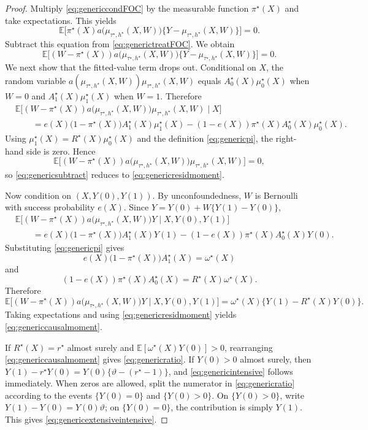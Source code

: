 \documentclass[11pt]{article}
\newcommand{\E}{\mathbb{E}}
\newcommand{\1}{\mathbf{1}}
\begin{document}
\begin{proof}
Multiply \eqref{eq:genericcondFOC} by the measurable function $\pi^\star(X)$ and take expectations. This yields
\[
\E\Big[\pi^\star(X)a\big(\mu_{\tau^\star,h^\star}(X,W)\big)\big\{Y-\mu_{\tau^\star,h^\star}(X,W)\big\}\Big]=0.
\]
Subtract this equation from \eqref{eq:generictreatFOC}. We obtain
\begin{equation}
\E\Big[(W-\pi^\star(X))a\big(\mu_{\tau^\star,h^\star}(X,W)\big)\big\{Y-\mu_{\tau^\star,h^\star}(X,W)\big\}\Big]=0.
\label{eq:genericsubtract}
\end{equation}
We next show that the fitted-value term drops out. Conditional on $X$, the random variable $a(\mu_{\tau^\star,h^\star}(X,W))\mu_{\tau^\star,h^\star}(X,W)$ equals $A_0^\star(X)\mu_0^\star(X)$ when $W=0$ and $A_1^\star(X)\mu_1^\star(X)$ when $W=1$. Therefore
\begin{align*}
&\E\Big[(W-\pi^\star(X))a\big(\mu_{\tau^\star,h^\star}(X,W)\big)\mu_{\tau^\star,h^\star}(X,W)\mid X\Big]
\\
&\qquad=
 e(X)\big(1-\pi^\star(X)\big)A_1^\star(X)\mu_1^\star(X)
 -(1-e(X))\pi^\star(X)A_0^\star(X)\mu_0^\star(X).
\end{align*}
Using $\mu_1^\star(X)=R^\star(X)\mu_0^\star(X)$ and the definition \eqref{eq:genericpi}, the right-hand side is zero. Hence
\[
\E\Big[(W-\pi^\star(X))a\big(\mu_{\tau^\star,h^\star}(X,W)\big)\mu_{\tau^\star,h^\star}(X,W)\Big]=0,
\]
so \eqref{eq:genericsubtract} reduces to \eqref{eq:genericresidmoment}.

Now condition on $(X,Y(0),Y(1))$. By unconfoundedness, $W$ is Bernoulli with success probability $e(X)$. Since $Y=Y(0)+W\{Y(1)-Y(0)\}$,
\begin{align*}
&\E\Big[(W-\pi^\star(X))a\big(\mu_{\tau^\star,h^\star}(X,W)\big)Y\mid X,Y(0),Y(1)\Big]
\\
&\qquad=
 e(X)\big(1-\pi^\star(X)\big)A_1^\star(X)Y(1)
 -(1-e(X))\pi^\star(X)A_0^\star(X)Y(0).
\end{align*}
Substituting \eqref{eq:genericpi} gives
\[
 e(X)\big(1-\pi^\star(X)\big)A_1^\star(X)
 =
 \omega^\star(X)
\]
and
\[
(1-e(X))\pi^\star(X)A_0^\star(X)
=
R^\star(X)\omega^\star(X).
\]
Therefore
\[
\E\Big[(W-\pi^\star(X))a\big(\mu_{\tau^\star,h^\star}(X,W)\big)Y\mid X,Y(0),Y(1)\Big]
=
\omega^\star(X)\{Y(1)-R^\star(X)Y(0)\}.
\]
Taking expectations and using \eqref{eq:genericresidmoment} yields \eqref{eq:genericcausalmoment}.

If $R^\star(X)=r^\star$ almost surely and $\E[\omega^\star(X)Y(0)]>0$, rearranging \eqref{eq:genericcausalmoment} gives \eqref{eq:genericratio}. If $Y(0)>0$ almost surely, then $Y(1)-r^\star Y(0)=Y(0)\{\vartheta-(r^\star-1)\}$, and \eqref{eq:genericintensive} follows immediately. When zeros are allowed, split the numerator in \eqref{eq:genericratio} according to the events $\{Y(0)=0\}$ and $\{Y(0)>0\}$. On $\{Y(0)>0\}$, write $Y(1)-Y(0)=Y(0)\vartheta$; on $\{Y(0)=0\}$, the contribution is simply $Y(1)$. This gives \eqref{eq:genericextensiveintensive}.
\end{proof}
\end{document}
